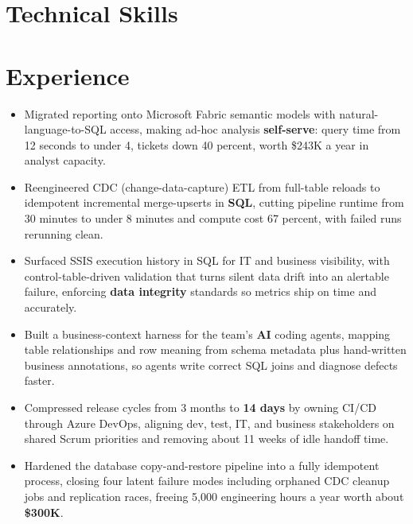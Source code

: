 \documentclass[letterpaper,10pt]{article}
\begin{document}
\resumeheader
{}

\section{Technical Skills}

\section{Experience}
\begin{itemize}
\item Migrated reporting onto Microsoft Fabric semantic models with natural-language-to-SQL access, making ad-hoc analysis \textbf{self-serve}: query time from 12 seconds to under 4, tickets down 40 percent, worth \$243K a year in analyst capacity.
\item Reengineered CDC (change-data-capture) ETL from full-table reloads to idempotent incremental merge-upserts in \textbf{SQL}, cutting pipeline runtime from 30 minutes to under 8 minutes and compute cost 67 percent, with failed runs rerunning clean.
\item Surfaced SSIS execution history in SQL for IT and business visibility, with control-table-driven validation that turns silent data drift into an alertable failure, enforcing \textbf{data integrity} standards so metrics ship on time and accurately.
\item Built a business-context harness for the team's \textbf{AI} coding agents, mapping table relationships and row meaning from schema metadata plus hand-written business annotations, so agents write correct SQL joins and diagnose defects faster.
\item Compressed release cycles from 3 months to \textbf{14 days} by owning CI/CD through Azure DevOps, aligning dev, test, IT, and business stakeholders on shared Scrum priorities and removing about 11 weeks of idle handoff time.
\item Hardened the database copy-and-restore pipeline into a fully idempotent process, closing four latent failure modes including orphaned CDC cleanup jobs and replication races, freeing 5,000 engineering hours a year worth about \textbf{\$300K}.
\end{itemize}
\end{document}
